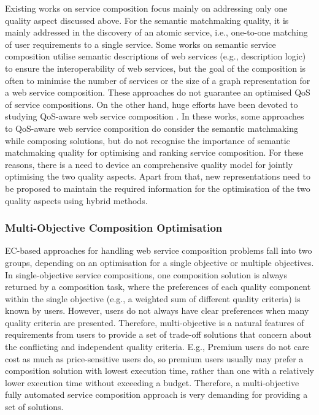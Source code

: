 Existing works on service composition focus mainly on addressing only one quality aspect discussed above. For the semantic matchmaking quality, it is mainly addressed in the discovery of an atomic service, i.e., one-to-one matching of user requirements to a single service. Some works \cite{bansal2016generalized,boustil2014semantic,mier2015integrated} on semantic service composition utilise semantic descriptions of web services (e.g., description logic) to ensure the interoperability of web services, but the goal of the composition is often to minimise the number of services or the size of a graph representation for a web service composition. These approaches do not guarantee an optimised QoS of service compositions. On the other hand, huge efforts have been devoted to studying QoS-aware web service composition \cite{da2015graphevol,da2016particle,gupta2015optimization,ma2015hybrid,qi2010combining,yu2013adaptive}. In these works, some approaches to QoS-aware web service composition do consider the semantic matchmaking while composing solutions, but do not recognise the importance of semantic matchmaking quality for optimising and ranking service composition. For these reasons, there is a need to device an comprehensive quality model for jointly optimising the two quality aspects. Apart from that, new representations need to be proposed to maintain the required information for the optimisation of the two quality aspects using hybrid methods.


\subsubsection{Multi-Objective Composition Optimisation}
EC-based approaches for handling web service composition problems fall into two groups, depending on an optimisation for a single objective or multiple objectives. In single-objective service compositions, one composition solution is always returned by a composition task, where the preferences of each quality component within the single objective (e.g., a weighted sum of different quality criteria) is known by users. However, users do not always have clear preferences when many quality criteria are presented. Therefore, multi-objective is a natural features of requirements from users to provide a set of trade-off solutions that concern about the conflicting and independent quality criteria. E.g., Premium users do not care cost as much as price-sensitive users do, so premium users usually may prefer a composition solution with lowest execution time,  rather than one with a relatively lower execution time without exceeding a budget. Therefore, a multi-objective  fully automated service composition approach is very demanding for providing a set of solutions.

